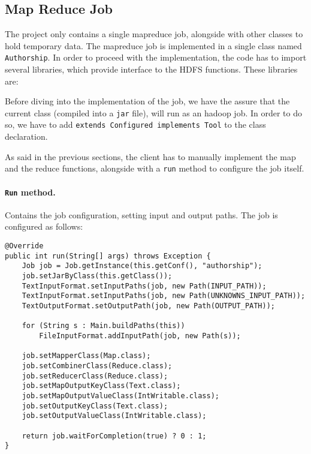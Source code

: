 \documentclass[a4paper,11pt, twoside]{article}
\begin{document}
	\subsection{Map Reduce Job}
	The project only contains a single mapreduce job, alongside with other classes to hold temporary data. The mapreduce job is implemented in a single class named \lstinline|Authorship|. In order to proceed with the implementation, the code has to import several libraries, which provide interface to the HDFS functions. These libraries are:
	\begin{figure}[h!]
	\end{figure}
	Before diving into the implementation of the job, we have the assure that the current class (compiled into a \verb|jar| file), will run as an hadoop job. In order to do so, we have to add \lstinline|extends Configured implements Tool| to the class declaration.
	
	\bigskip
	\noindent
	As said in the previous sections, the client has to manually implement the map and the reduce functions, alongside with a \lstinline|run| method to configure the job itself.
	
	\paragraph{\lstinline|Run| method.} Contains the job configuration, setting input and output paths.
	The job is configured as follows:
	
	\begin{lstlisting}[firstnumber=45]
@Override
public int run(String[] args) throws Exception {
	Job job = Job.getInstance(this.getConf(), "authorship");
	job.setJarByClass(this.getClass());
	TextInputFormat.setInputPaths(job, new Path(INPUT_PATH));
	TextInputFormat.setInputPaths(job, new Path(UNKNOWNS_INPUT_PATH));
	TextOutputFormat.setOutputPath(job, new Path(OUTPUT_PATH));
	
	for (String s : Main.buildPaths(this))
		FileInputFormat.addInputPath(job, new Path(s));
	
	job.setMapperClass(Map.class);
	job.setCombinerClass(Reduce.class);
	job.setReducerClass(Reduce.class);
	job.setMapOutputKeyClass(Text.class);
	job.setMapOutputValueClass(IntWritable.class);
	job.setOutputKeyClass(Text.class);
	job.setOutputValueClass(IntWritable.class);
	
	return job.waitForCompletion(true) ? 0 : 1;
}
	\end{lstlisting}
	
\end{document}
